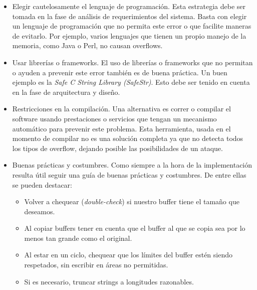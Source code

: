 \begin{itemize}
    \item Elegir cautelosamente el lenguaje de programación. Esta estrategia debe ser tomada en la fase de análisis de requerimientos del sistema.
	Basta con elegir un lenguaje de programación que no permita este error o que facilite maneras de evitarlo.
	Por ejemplo, varios lenguajes que tienen un propio manejo de la memoria, como Java o Perl, no causan overflows.
    \item Usar librerías o frameworks.
	El uso de librerías o frameworks que no permitan o ayuden a prevenir este error también es de buena práctica.
	Un buen ejemplo es la \textit{Safe C String Library (SafeStr)}.
	Esto debe ser tenido en cuenta en la fase de arquitectura y diseño.
    \item Restricciones en la compilación.
	Una alternativa es correr o compilar el software usando prestaciones o servicios que tengan un mecanismo automático para prevenir este problema.
	Esta herramienta, usada en el momento de compilar no es una solución completa ya que no detecta todos los tipos de overflow, dejando posible las posibilidades de un ataque.
    \item Buenas prácticas y costumbres.
	Como siempre a la hora de la implementación resulta útil seguir una guía de buenas prácticas y costumbres.
	De entre ellas se pueden destacar:

        \begin{itemize}
            \item Volver a chequear (\textit{double-check}) si nuestro buffer tiene el tamaño que deseamos.

            \item Al copiar buffers tener en cuenta que el buffer al que se copia sea por lo menos tan grande como el original.

            \item Al estar en un ciclo, chequear que los límites del buffer estén siendo respetados, sin escribir en áreas no permitidas.

            \item Si es necesario, truncar strings a longitudes razonables.
        \end{itemize}


\end{itemize}
